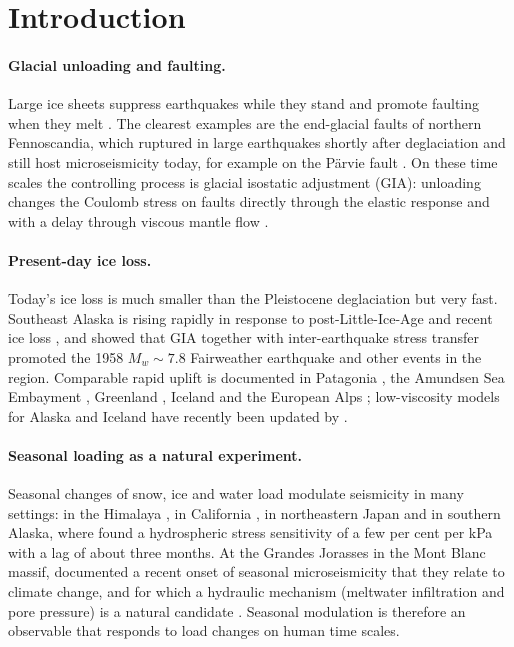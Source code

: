 \documentclass[11pt,a4paper]{article}
\begin{document}
\tableofcontents
\vspace{1em}

\section{Introduction}
\label{sec:intro}

\paragraph{Glacial unloading and faulting.}
Large ice sheets suppress earthquakes while they stand and promote faulting when they melt \parencite{johnston1987,hampel2010}. The clearest examples are the end-glacial faults of northern Fennoscandia, which ruptured in large earthquakes shortly after deglaciation \parencite{lagerback2008} and still host microseismicity today, for example on the P\"arvie fault \parencite{lindblom2015}. On these time scales the controlling process is glacial isostatic adjustment (GIA): unloading changes the Coulomb stress on faults directly through the elastic response and with a delay through viscous mantle flow \parencite{turcotte2002,hampel2010}.

\paragraph{Present-day ice loss.}
Today's ice loss is much smaller than the Pleistocene deglaciation but very fast. Southeast Alaska is rising rapidly in response to post-Little-Ice-Age and recent ice loss \parencite{larsen2004,larsen2005}, and \textcite{rollins2021} showed that GIA together with inter-earthquake stress transfer promoted the 1958 $M_w\sim7.8$ Fairweather earthquake and other events in the region. Comparable rapid uplift is documented in Patagonia \parencite{lange2014}, the Amundsen Sea Embayment \parencite{barletta2018}, Greenland \parencite{khan2016}, Iceland \parencite{pagli2007} and the European Alps \parencite{mey2016}; low-viscosity models for Alaska and Iceland have recently been updated by \textcite{sasgen2026}.

\paragraph{Seasonal loading as a natural experiment.}
Seasonal changes of snow, ice and water load modulate seismicity in many settings: in the Himalaya \parencite{bettinelli2008}, in California \parencite{johnson2017,sirorattanakul2026}, in northeastern Japan \parencite{ueda2024} and in southern Alaska, where \textcite{johnson2020} found a hydrospheric stress sensitivity of a few per cent per kPa with a lag of about three months. At the Grandes Jorasses in the Mont Blanc massif, \textcite{simon2025} documented a recent onset of seasonal microseismicity that they relate to climate change, and for which a hydraulic mechanism (meltwater infiltration and pore pressure) is a natural candidate \parencite[cf.][]{talwani2007}. Seasonal modulation is therefore an observable that responds to load changes on human time scales.
\end{document}
